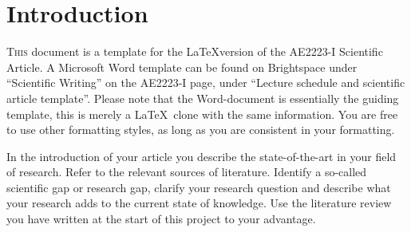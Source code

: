 \section{Introduction}

\lettrine{T}{his} document is a template for the \LaTeX version of the AE2223-I Scientific Article. A Microsoft Word template can be found on Brightspace under “Scientific Writing” on the AE2223-I page, under “Lecture schedule and scientific article template”. Please note that the Word-document is essentially the guiding template, this is merely a \LaTeX~clone with the same information. You are free to use other formatting styles, as long as you are consistent in your formatting.

In the introduction of your article you describe the state-of-the-art in your field of research. Refer to the relevant sources of literature. Identify a so-called scientific gap or research gap, clarify your research question and describe what your research adds to the current state of knowledge. Use the literature review you have written at the start of this project to your advantage.
